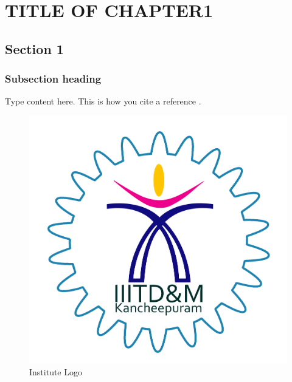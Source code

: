 \chapter{TITLE OF CHAPTER1}
\graphicspath{{Chapter1/}}

\section{Section 1}
\subsection{Subsection heading}
Type content here. This is how you cite a reference \cite{journal}.
\begin{figure}[h]
	\centering
	\includegraphics[scale=0.3]{logo}
	\caption{Institute Logo}
\end{figure}
